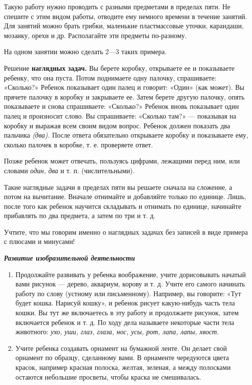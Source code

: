 \documentclass[a5paper]{book}
\renewcommand{\emph}[1]{\textit{#1}}
\begin{document}
Такую работу нужно проводить с разными предметами в пределах пяти. Не
спешите с этим видом работы, отводите ему немного времени в течение
занятий. Для занятий можно брать грибки, маленькие пластмассовые уточки,
карандаши, мозаику, орехи и др. Располагайте эти предметы по-разному.

На одном занятии можно сделать 2---3 таких примера.

Решение \textbf{наглядных задач.} Вы берете коробку, открываете ее и
показываете ребенку, что она пуста. Потом поднимаете одну палочку,
спрашиваете: «Сколько?» Ребенок показывает один палец и говорит: «Один»
(как может). Вы прячете палочку в коробку и закрываете ее. Затем берете
другую палочку, опять показываете и снова спрашиваете: «Сколько?»
Ребенок вновь показывает один палец и произносит слово. Вы спрашиваете:
«Сколько там?» --- показывая на коробку и выражая всем своим видом
вопрос. Ребенок должен показать два пальчика \emph{(два).} После ответа
обязательно открываете коробку и показываете ему, сколько палочек в
коробке, т. е. проверяете ответ.

Позже ребенок может отвечать, пользуясь цифрами, лежащими перед ним, или
словами \emph{один, два} и т. п. (числительными).

Такие наглядные задачи в пределах пяти вы решаете сначала на сложение, а
потом на вычитание. Вначале отнимайте и добавляйте только по единице.
Лишь, после того как ребенок научится складывать и отнимать по единице,
начинайте прибавлять по два предмета, а затем по три и т. д.

Учтите, что мы говорим именно о наглядных задачах без записей в виде
примера с плюсами и минусами!

\emph{\textbf{Развитие изобразительной деятельности}}


\begin{enumerate}
\def\labelenumi{\arabic{enumi}.}
\item
  
  Продолжайте развивать у ребенка воображение, учите дорисовывать
  начатый вами рисунок --- дерево, аквариум, корову и т. д. Учите его
  самого начинать работу по слову (устному или письменному). Например,
  вы говорите: «Тут будет кошка. Нарисуй кошку», и ребенок рисует
  какую-нибудь часть тела кошки. Вы тут же включаетесь в эту работу и
  продолжаете рисунок, затем включается ребенок и т. д. По ходу дела
  называете некоторые части тела животного: \emph{ухо, уши, глаз, глаза,
  нос, усы, рот, лапа, лапы, хвост.}
  
\item
  
  Учите ребенка создавать орнамент на бумажной ленте. Он делает свой
  орнамент по образцу, сделанному вами. В орнаменте чередуются цвета
  красок, например красная полоска, желтая, зеленая, а между полосками
  остаются небольшие просветы, чтобы краска не смешивалась.
  
\end{enumerate}
\end{document}

